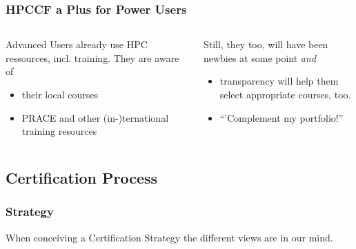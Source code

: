 \begin{frame}
  \frametitle{HPCCF a Plus for Power Users}
  \begin{columns}
    \begin{column}{.5\textwidth}
      Advanced Users already use HPC ressources, incl. training. They are aware of
      \begin{itemize}
       \item their local courses
       \item PRACE and other (in-)ternational training resources
      \end{itemize}
    \end{column}
    \begin{column}{.5\textwidth}
      \pause
      Still, they too, will have been newbies at some point \emph{and}
      \begin{itemize}[<+->]
        \item transparency will help them select appropriate courses, too.
        \item ``'Complement my portfolio!''
      \end{itemize}
    \end{column}
  \end{columns}
\end{frame}

\subsection{Certification Process}

\begin{frame}
  \frametitle{Strategy}
  When conceiving a Certification Strategy the different views are in our mind.
  
\end{frame}

